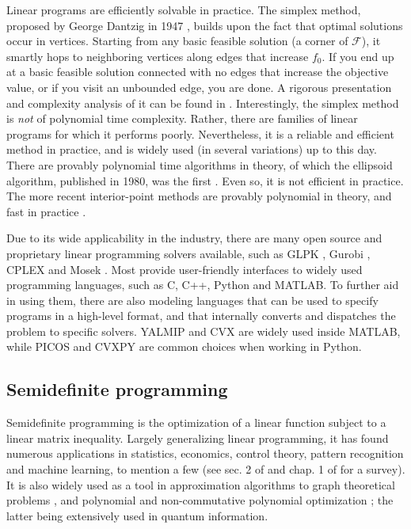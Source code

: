 			Linear programs are efficiently solvable in practice. The simplex method, proposed by George Dantzig in 1947 \cite{}, builds upon the fact that optimal solutions occur in vertices. Starting from any basic feasible solution (a corner of $\mathcal{F}$), it smartly hops to neighboring vertices along edges that increase $f_0$. If you end up at a basic feasible solution connected with no edges that increase the objective value, or if you visit an unbounded edge, you are done. A rigorous presentation and complexity analysis of it can be found in \cite{papadimitriou}. Interestingly, the simplex method is \emph{not} of polynomial time complexity. Rather, there are families of linear programs for which it performs poorly. Nevertheless, it is a reliable and efficient method in practice, and is widely used (in several variations) up to this day. There are provably polynomial time algorithms in theory, of which the ellipsoid algorithm, published in 1980, was the first \cite{}. Even so, it is not efficient in practice. The more recent interior-point methods are provably polynomial in theory, and fast in practice \cite{}.

			Due to its wide applicability in the industry, there are many open source and proprietary linear programming solvers available, such as GLPK \cite{}, Gurobi \cite{}, CPLEX \cite{} and Mosek \cite{}. Most provide user-friendly interfaces to widely used programming languages, such as C, C++, Python and MATLAB. To further aid in using them, there are also modeling languages that can be used to specify programs in a high-level format, and that internally converts and dispatches the problem to specific solvers. YALMIP \cite{} and CVX \cite{} are widely used inside MATLAB, while PICOS \cite{} and CVXPY \cite{} are common choices when working in Python.	


		\subsection{Semidefinite programming}
		\label{sec:sdp}

			Semidefinite programming is the optimization of a linear function subject to a linear matrix inequality. Largely generalizing linear programming, it has found numerous applications in statistics, economics, control theory, pattern recognition and machine learning, to mention a few (see sec. 2 of \cite{vanderberghe_boyd_1996} and chap. 1 of \cite{boydbook} for a survey). It is also widely used as a tool in approximation algorithms to graph theoretical problems \cite{gartner}, and polynomial and non-commutative polynomial optimization \cite{lasserre,navascues}; the latter being extensively used in quantum information.

